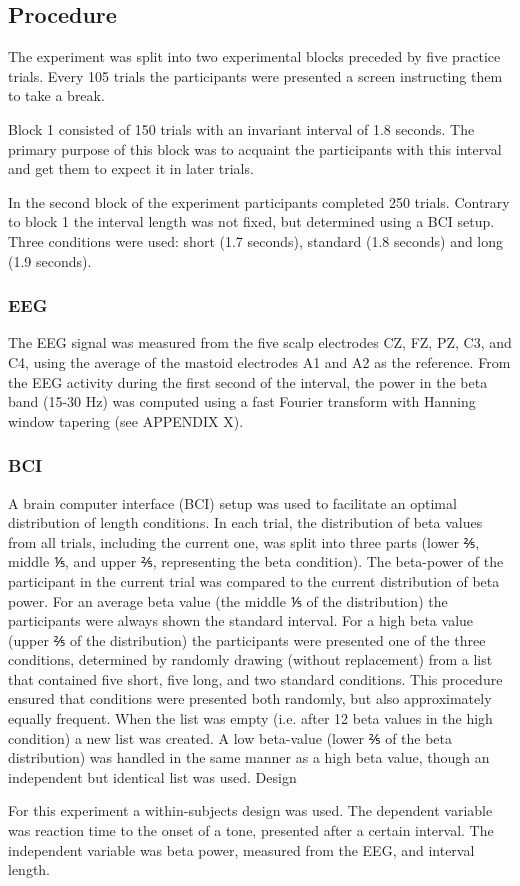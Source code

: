 \subsection{Procedure}
The experiment was split into two experimental blocks preceded by five practice trials. Every 105 trials the participants were presented a screen instructing them to take a break.

Block 1 consisted of 150 trials with an invariant interval of 1.8 seconds. The primary purpose of this block was to acquaint the participants with this interval and get them to expect it in later trials.

In the second block of the experiment participants completed 250 trials. Contrary to block 1 the interval length was not fixed, but determined using a BCI setup. Three conditions were used: short (1.7 seconds), standard (1.8 seconds) and long (1.9 seconds).

\subsubsection{EEG}
The EEG signal was measured from the five scalp electrodes CZ, FZ, PZ, C3, and C4, using the average of the mastoid electrodes A1 and A2 as the reference. From the EEG activity during the first second of the interval, the power in the beta band (15-30 Hz) was computed using a fast Fourier transform with Hanning window tapering (see APPENDIX X).

\subsubsection{BCI}
A brain computer interface (BCI) setup was used to facilitate an optimal distribution of length conditions. In each trial, the distribution of beta values from all trials, including the current one, was split into three parts (lower ⅖, middle ⅕, and upper ⅖, representing the beta condition). The beta-power of the participant in the current trial was compared to the current distribution of beta power.
For an average beta value (the middle ⅕ of the distribution) the participants were always shown the standard interval. For a high beta value (upper ⅖ of the distribution) the participants were presented one of the three conditions, determined by randomly drawing (without replacement) from a list that contained five short, five long, and two standard conditions. This procedure ensured that conditions were presented both randomly, but also approximately equally frequent. When the list was empty (i.e. after 12 beta values in the high condition) a new list was created.
A low beta-value (lower ⅖ of the beta distribution) was handled in the same manner as a high beta value, though an independent but identical list was used.
Design

For this experiment a within-subjects design was used. The dependent variable was reaction time to the onset of a tone, presented after a certain interval. The independent variable was beta power, measured from the EEG, and interval length.
